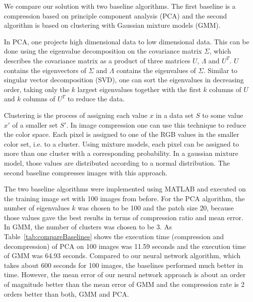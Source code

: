 We compare our solution with two baseline algorithms. The first baseline is a compression based on principle component analysis (PCA) and the second algorithm is based on clustering with Gaussian mixture models (GMM).  

In PCA, one projects high dimensional data to low dimensional data. This can be done using the eigenvalue decomposition on the covariance matrix $\Sigma$, which describes the covariance matrix as a product of three matrices \(U\), $\Lambda$ and $U^T$. \(U\) contains the eigenvectors of  $\Sigma$ and $\Lambda$ contains the eigenvalues of $\Sigma$. Similar to singular vector decomposition (SVD), one can sort the eigenvalues in decreasing order, taking only the \(k\) largest eigenvalues together with the first \(k\) columns of \(U\) and \(k\) columns of \(U^T\) to reduce the data. 

Clustering is the process of assigning each value \(x\) in a data set \(S\) to some value \(x'\) of a smaller set \(S'\). In image compression one can use this technique to reduce the color space. Each pixel is assigned to one of the RGB values in the smaller color set, i.e. to a cluster. Using mixture models, each pixel can be assigned to more than one cluster with a corresponding probability. In a gaussian mixture model, those values are distributed according to a normal distribution. The second baseline compresses images with this approach. 

The two baseline algorithms were implemented using MATLAB and executed on the training image set with 100 images from before. For the PCA algorithm, the number of eigenvalues \(k\) was chosen to be 100 and the patch size 20, because those values gave the best results in terms of compression ratio and mean error. In GMM, the number of clusters was chosen to be 3. As Table~\ref{tab:compareBaselines} shows the execution time (compression and decompression) of PCA on 100 images was 11.59 seconds and the execution time of GMM was 64.93 seconds. Compared to our neural network algorithm, which takes about 600 seconds for 100 images, the baselines performed much better in time. However, the mean error of our neural network approach is about an order of magnitude better than the mean error of GMM and the compression rate is 2 orders better than both, GMM and PCA.





